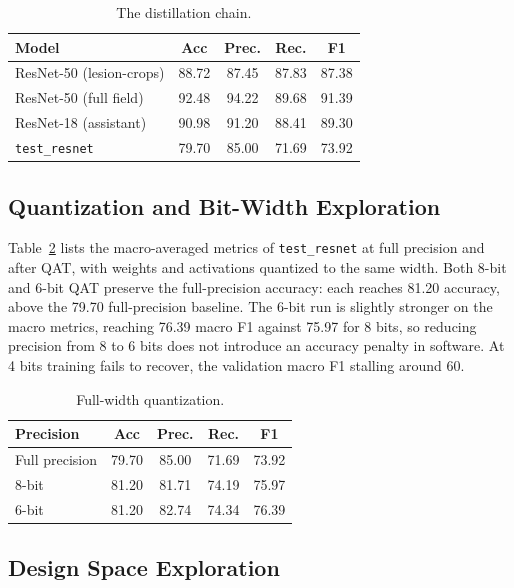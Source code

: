 \begin{table}[H]
\centering
\caption{The distillation chain.}
\label{tab:kd}
\begin{tabular}{lcccc}
\toprule
Model & Acc & Prec. & Rec. & F1 \\
\midrule
ResNet-50 (lesion-crops)   & 88.72 & 87.45 & 87.83 & 87.38 \\
ResNet-50 (full field)    & 92.48 & 94.22 & 89.68 & 91.39 \\
ResNet-18 (assistant)           & 90.98 & 91.20 & 88.41 & 89.30 \\
\texttt{test\_resnet} & 79.70 & 85.00 & 71.69 & 73.92 \\
\bottomrule
\end{tabular}
\end{table}

\subsection{Quantization and Bit-Width Exploration}
\label{sec:res-qat}

Table~\ref{tab:qat} lists the macro-averaged metrics of \texttt{test\_resnet} at
full precision and after QAT, with weights and activations quantized to the same
width. Both 8-bit and 6-bit QAT preserve the full-precision accuracy: each reaches
81.20 accuracy, above the 79.70 full-precision baseline. The 6-bit run is slightly
stronger on the macro metrics, reaching 76.39 macro F1 against 75.97 for 8 bits,
so reducing precision from 8 to 6 bits does not introduce an accuracy penalty in
software. At 4 bits training fails to recover, the validation macro F1 stalling
around 60.

\begin{table}[H]
\centering
\caption{Full-width quantization.}
\label{tab:qat}
\begin{tabular}{lcccc}
\toprule
Precision & Acc & Prec. & Rec. & F1 \\
\midrule
Full precision & 79.70 & 85.00 & 71.69 & 73.92 \\
8-bit          & 81.20 & 81.71 & 74.19 & 75.97 \\
6-bit          & 81.20 & 82.74 & 74.34 & 76.39 \\
\bottomrule
\end{tabular}
\end{table}

\subsection{Design Space Exploration}
\label{sec:res-dse}

